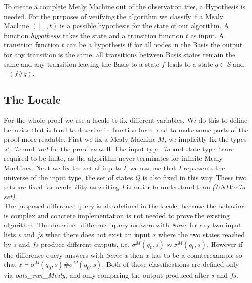 To create a complete Mealy Machine out of the observation tree, a Hypothesis is needed. For the purposes of verifying the algorithm we classify if a Mealy Machine $([],t)$ is a possible hypothesis for the state of our algorithm. A function \textit{hypothesis} takes the state and a transition function $t$ as input. A transition function $t$ can be a hypothesis if for all nodes in the Basis the output for any transition is the same, all transitions between Basis states remain the same and any transition leaving the Basis to a state $f$ leads to a state $q\in S$ and $\neg (f\#q)$.
\begin{myisabelle}
	\hypothesis
\end{myisabelle}
\subsection{The Locale}
For the whole proof we use a locale to fix different variables. We do this to define behavior that is hard to describe in function form, and to make some parts of the proof more readable. First we fix a Mealy Machine $M$, we implicitly fix the types \textit{s'}, \textit{'in} and \textit{'out} for the proof as well. The input type \textit{'in} and state type \textit{'s} are required to be finite, as the algorithm never terminates for infinite Mealy Machines. Next we fix the set of inputs \textit{I}, we assume that \textit{I} represents the universe of the input type, the set of states \textit{Q} is also fixed in this way. These two sets are fixed for readability as writing \textit{I} is easier to understand than \textit{(UNIV::'in set)}. \\
The proposed difference query is also defined in the locale, because the behavior is complex and concrete implementation is not needed to prove the existing algorithm. The described difference query answers with \textit{None} for any two input lists $s$ and $fs$ when there does not exist an input $x$ where the two states reached by $s$ and $fs$ produce different outputs, i.e. $\sigma^M(q_0,s)\approx\sigma^M(q_0,s)$. However if the difference query answers with \textit{Some x} then $x$ has to be a counterexample so that $x\vdash\sigma^M(q_0,s)\#\sigma^M(q_0,s) $. Both of those classifications are defined only via \textit{outs\_run\_Mealy}, and only comparing the output produced after $s$ and $fs$.
\begin{myisabelle}
	\localedef
\end{myisabelle}
